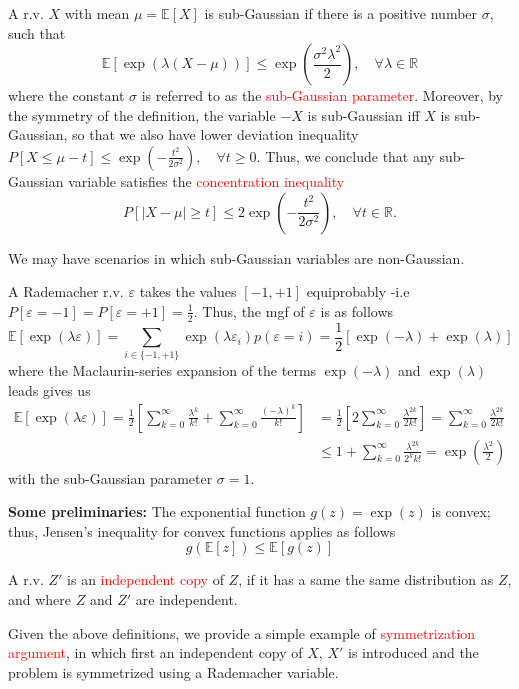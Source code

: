 \documentclass[10pt,handout,english]{beamer}
\newcommand{\E}{\mathbb{E}}
\begin{document}
\begin{frame}
\begin{definition}
A r.v. $X$ with mean $\mu=\E[X]$ is sub-Gaussian if there is a positive number $\sigma$, such that
\[
\E[\exp(\lambda(X-\mu))]\leq\exp\left(\frac{\sigma^2\lambda^2}{2}\right),\quad\forall\lambda\in\mathbb{R}
\]
where the constant $\sigma$ is referred to as the \textcolor{red}{sub-Gaussian parameter}. Moreover, by the symmetry of the definition, the variable $-X$ is sub-Gaussian iff $X$ is sub-Gaussian, so that we also have lower deviation inequality $P[X\leq\mu-t ]\leq\exp\left(-\frac{t^2}{2\sigma^2}\right), \quad\forall t\geq 0$. Thus, we conclude that any sub-Gaussian variable satisfies the \textcolor{red}{concentration inequality}
\[
P[\lvert X-\mu\rvert\geq t]\leq2\exp\left(-\frac{t^2}{2\sigma^2}\right),\quad\forall t\in\mathbb{R}.
\]
\end{definition}
\end{frame}
\begin{frame}
We may have scenarios in which sub-Gaussian variables are non-Gaussian.
\begin{example}
A Rademacher r.v. $\varepsilon$ takes the values $[-1,+1]$ equiprobably -i.e $P[\varepsilon=-1]=P[\varepsilon=+1]=\frac{1}{2}$. Thus, the mgf of $\varepsilon$ is as follows
\[
\E[\exp(\lambda \varepsilon)]=\sum_{i\in\{-1,+1\}} \exp(\lambda\varepsilon_i)p(\varepsilon=i)=\frac{1}{2}[\exp(-\lambda)+\exp(\lambda)]
\]
where the Maclaurin-series expansion of the terms $\exp(-\lambda)$ and $\exp(\lambda)$ leads gives us
\begin{align*}
\E[\exp(\lambda \varepsilon)]=\frac{1}{2}\left[\sum\limits_{k=0}^{\infty}\frac{\lambda^k}{k!}+\sum\limits_{k=0}^{\infty}\frac{(-\lambda)^k}{k!}\right]&=\frac{1}{2}\left[2\sum\limits_{k=0}^{\infty}\frac{\lambda^{2k}}{2k!}\right]=\sum\limits_{k=0}^{\infty}\frac{\lambda^{2k}}{2k!}\\
&\leq 1+\sum\limits_{k=0}^{\infty}\frac{\lambda^{2k}}{2^kk!}=\exp\left(\frac{\lambda^2}{2}\right)
\end{align*}
with the sub-Gaussian parameter $\sigma=1$.
\end{example}
\end{frame}

\begin{frame}
\textbf{Some preliminaries:}  The exponential function $g(z)=\exp(z)$ is convex; thus, Jensen's inequality for convex functions applies as follows
\[
g(\E[z])\leq \E[g(z)]
\] 

A r.v. $Z'$ is an \textcolor{red}{independent copy} of $Z$, if it has a same the same distribution as $Z$, and where $Z$ and $Z'$ are independent. 

Given the above definitions, we provide a simple example of \textcolor{red}{symmetrization argument}, in which first an independent copy of $X$, $X'$ is introduced and the problem is symmetrized using a Rademacher variable.
\end{frame}
\end{document}
